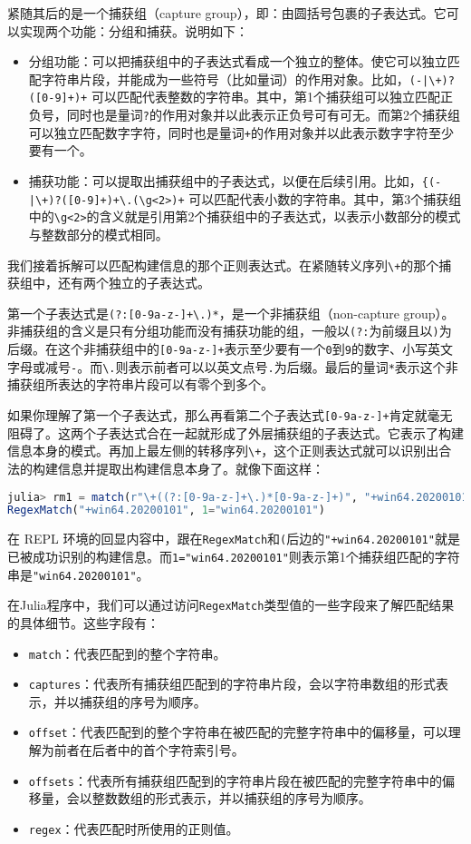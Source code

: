 紧随其后的是一个捕获组（capture group），即：由圆括号包裹的子表达式。它可以实现两个功能：分组和捕获。说明如下：

\begin{itemize}
\item 分组功能：可以把捕获组中的子表达式看成一个独立的整体。使它可以独立匹配字符串片段，并能成为一些符号（比如量词）的作用对象。比如，\verb`(-|\+)?([0-9]+)+` 可以匹配代表整数的字符串。其中，第1个捕获组可以独立匹配正负号，同时也是量词\verb|?|的作用对象并以此表示正负号可有可无。而第2个捕获组可以独立匹配数字字符，同时也是量词\verb|+|的作用对象并以此表示数字字符至少要有一个。
\item 捕获功能：可以提取出捕获组中的子表达式，以便在后续引用。比如，\verb`{(-|\+)?([0-9]+)+\.(\g<2>)+` 可以匹配代表小数的字符串。其中，第3个捕获组中的\verb|\g<2>|的含义就是引用第2个捕获组中的子表达式，以表示小数部分的模式与整数部分的模式相同。
\end{itemize}

我们接着拆解可以匹配构建信息的那个正则表达式。在紧随转义序列\verb|\+|的那个捕获组中，还有两个独立的子表达式。

第一个子表达式是\verb|(?:[0-9a-z-]+\.)*|，是一个非捕获组（non-capture group）。非捕获组的含义是只有分组功能而没有捕获功能的组，一般以\verb|(?:|为前缀且以\verb|)|为后缀。在这个非捕获组中的\verb|[0-9a-z-]+|表示至少要有一个\verb|0|到\verb|9|的数字、小写英文字母或减号\verb|-|。而\verb|\.|则表示前者可以以英文点号\verb|.|为后缀。最后的量词\verb|*|表示这个非捕获组所表达的字符串片段可以有零个到多个。

如果你理解了第一个子表达式，那么再看第二个子表达式\verb|[0-9a-z-]+|肯定就毫无阻碍了。这两个子表达式合在一起就形成了外层捕获组的子表达式。它表示了构建信息本身的模式。再加上最左侧的转移序列\verb|\+|，这个正则表达式就可以识别出合法的构建信息并提取出构建信息本身了。就像下面这样：
\begin{lstlisting}[language=julia]
julia> rm1 = match(r"\+((?:[0-9a-z-]+\.)*[0-9a-z-]+)", "+win64.20200101")
RegexMatch("+win64.20200101", 1="win64.20200101")
\end{lstlisting}

在 REPL 环境的回显内容中，跟在\verb|RegexMatch|和\verb|(|后边的\verb|"+win64.20200101"|就是已被成功识别的构建信息。而\verb|1="win64.20200101"|则表示第1个捕获组匹配的字符串是\verb|"win64.20200101"|。

在Julia程序中，我们可以通过访问\verb|RegexMatch|类型值的一些字段来了解匹配结果的具体细节。这些字段有：
\begin{itemize}
\item \verb|match|：代表匹配到的整个字符串。
\item \verb|captures|：代表所有捕获组匹配到的字符串片段，会以字符串数组的形式表示，并以捕获组的序号为顺序。
\item \verb|offset|：代表匹配到的整个字符串在被匹配的完整字符串中的偏移量，可以理解为前者在后者中的首个字符索引号。
\item \verb|offsets|：代表所有捕获组匹配到的字符串片段在被匹配的完整字符串中的偏移量，会以整数数组的形式表示，并以捕获组的序号为顺序。
\item \verb|regex|：代表匹配时所使用的正则值。
\end{itemize}

